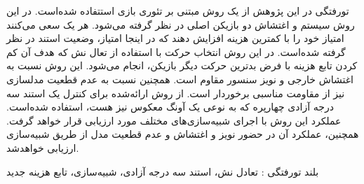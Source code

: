 


\pagestyle{empty}

\begin{وسط‌چین}
\end{وسط‌چین}

‌تورفتگی در این پژوهش از یک روش مبتنی بر تئوری بازی استتفاده شده‌است. در این روش سیستم و اغتشاش دو بازیکن اصلی در نظر گرفته می‌شود. هر یک سعی می‌کنند امتیاز خود را  با کمترین هزینه افزایش دهند که در اینجا امتیاز، وضعیت استند در نظر گرفته ‌شده‌است. در این روش انتخاب حرکت با استفاده از تعال نش
 که هدف آن کم کردن تابع هزینه با فرض بدترین حرکت دیگر بازیکن، انجام می‌شود.
این روش نسبت به اغتشاش خارجی و 
نویز سنسور مقاوم است. همچنین نسبت به عدم قطعیت مدلسازی نیز از مقاومت مناسبی برخوردار است. از روش ارائه‌شده برای کنترل یک استند سه درجه آزادی چهارپره که به نوعی یک آونگ معكوس نیز هست، استفاده شده‌است. 
عملكرد این روش با اجرای شبیه‌سازی‌های مختلف مورد ارزیابی قرار خواهد گرفت. همچنین، عملكرد آن 
در حضور نویز و اغتشاش و عدم قطعیت مدل از طریق شبیه‌سازی ارزیابی خواهد‌شد.

‌بلند
‌تورفتگی : 
تعادل نش، استند سه درجه آزادی، شبیه‌سازی، تابع هزینه
‌جدید
